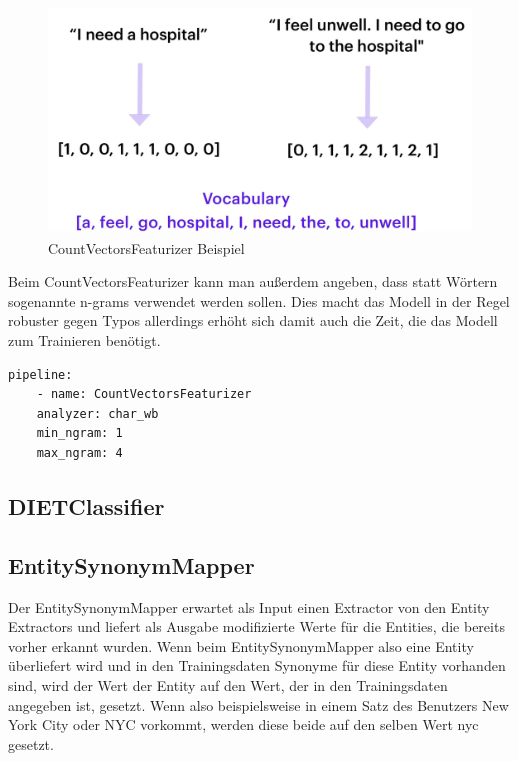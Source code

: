 \begin{figure}[hbt!]
  \centering
  \includegraphics[scale=0.25]{pics/countvectorsfeaturizer}
  \caption{CountVectorsFeaturizer Beispiel~\cite{pipelineConfigurationVideo}}
  \label{fig:CountVectorsFeaturizer}
\end{figure}

Beim CountVectorsFeaturizer kann man außerdem angeben, dass statt Wörtern sogenannte n-grams verwendet werden sollen.
Dies macht das Modell in der Regel robuster gegen Typos allerdings erhöht sich damit auch die Zeit, die das Modell zum Trainieren benötigt.\cite{countVectorsFeaturizer, pipelineConfigurationVideo, pipelineComponentsYoutube, rasaMasterclassCountVectorsFeaturizer}

\begin{lstlisting}[label={lst: CountVectorsFeaturizer with n-grams}]
pipeline:
    - name: CountVectorsFeaturizer
    analyzer: char_wb
    min_ngram: 1
    max_ngram: 4
\end{lstlisting}

\subsection{DIETClassifier}

\subsection{EntitySynonymMapper}

Der EntitySynonymMapper erwartet als Input einen Extractor von den Entity Extractors und liefert als Ausgabe modifizierte Werte für die Entities, die bereits vorher erkannt wurden.
Wenn beim EntitySynonymMapper also eine Entity überliefert wird und in den Trainingsdaten Synonyme für diese Entity vorhanden sind, wird der Wert der Entity auf den Wert, der in den Trainingsdaten angegeben ist, gesetzt.
Wenn also beispielsweise in einem Satz des Benutzers New York City oder NYC vorkommt, werden diese beide auf den selben Wert nyc gesetzt.\cite{entitySynonymMapper}

